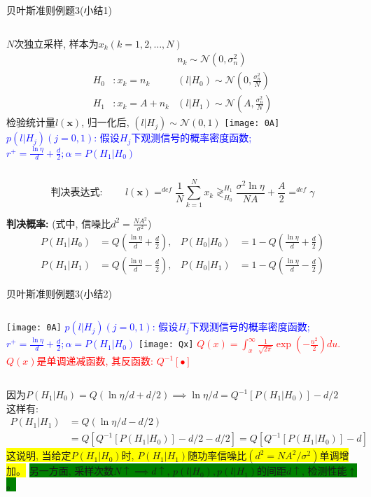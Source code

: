 \begin{frame}[shrink]{贝叶斯准则例题3(小结1)}
\begin{columns}
	$N$次独立采样, 样本为$x_k(k=1,2,\dots,N)$
	\begin{align*}
	&&n_k\sim\mathcal{N}(0,\sigma_n^2)\\ 
	H_0 &:x_k=n_k   &(l|H_0)\sim\mathcal{N}(0,\frac{\sigma_n^2}{N})\\
	H_1 &:x_k=A+n_k &(l|H_1)\sim\mathcal{N}(A,\frac{\sigma_n^2}{N})
	\end{align*}
	检验统计量$l(\bm{x})$, 归一化后, $(l|H_j)\sim\mathcal{N}(0,1)$
	\texttt{[image: 0A]}\\
	\scriptsize
	\textcolor{blue}{$p(l|H_j)(j=0,1)$: 假设$H_j$下观测信号的概率密度函数; $r^+=\frac{\ln\eta}{d}+\frac{d}{2}; \alpha=P(H_1|H_0)$}
\end{columns}
\[
\textbf{判决表达式: }\qquad l(\bm{x})\mathop{=}^{def}\frac{1}{N}\sum\limits_{k=1}^Nx_k\mathop{\gtrless}_{H_0}^{H_1}\frac{\sigma^2\ln\eta}{NA}+\frac{A}{2}\mathop{=}^{def}\gamma
\]

\textbf{判决概率:} (式中, 信噪比$d^2=\frac{NA^2}{\sigma^2}$)
\begin{align*}
P(H_1|H_0)&=Q\left(\frac{\ln\eta}{d}+\frac{d}{2}\right), &P(H_0|H_0)&=1-Q\left(\frac{\ln\eta}{d}+\frac{d}{2}\right)\\
P(H_1|H_1)&=Q\left(\frac{\ln\eta}{d}-\frac{d}{2}\right),
&P(H_0|H_1)&=1-Q\left(\frac{\ln\eta}{d}-\frac{d}{2}\right)
\end{align*}
\end{frame}

\begin{frame}{贝叶斯准则例题3(小结2)}
\begin{columns}
	\texttt{[image: 0A]}
	\scriptsize
	\textcolor{blue}{$p(l|H_j)(j=0,1)$: 假设$H_j$下观测信号的概率密度函数; $r^+=\frac{\ln\eta}{d}+\frac{d}{2}; \alpha=P(H_1|H_0)$}
	\texttt{[image: Qx]}
	\scriptsize
	\textcolor{red}{$Q(x)=\int_{x}^{\infty}\frac{1}{\sqrt{2\pi}}\exp(-\frac{u^2}{2})du$.}\\
	\textcolor{red}{$Q(x)$是单调递减函数, 其反函数: $Q^{-1}[\bullet]$}
\end{columns}

\bigskip

因为$P(H_1|H_0)=Q(\ln\eta/d+d/2) \implies \ln\eta/d=Q^{-1}[P(H_1|H_0)]-d/2$\\
这样有:
\begin{align*}
P(H_1|H_1)&=Q\left(\ln\eta/d-d/2\right)\\
&=Q[Q^{-1}[P(H_1|H_0)]-d/2-d/2]=Q[Q^{-1}[P(H_1|H_0)]-d]
\end{align*}
\colorbox{yellow}{这说明, 当给定$P(H_1|H_0)$时, $P(H_1|H_1)$随功率信噪比$(d^2=NA^2/\sigma^2)$单调增加。} 
\colorbox{green}{另一方面, 采样次数$N\uparrow\implies d\uparrow$, $p(l|H_0),p(l|H_1)$的间距$d\uparrow$,  检测性能$\uparrow$。} 
\end{frame}




